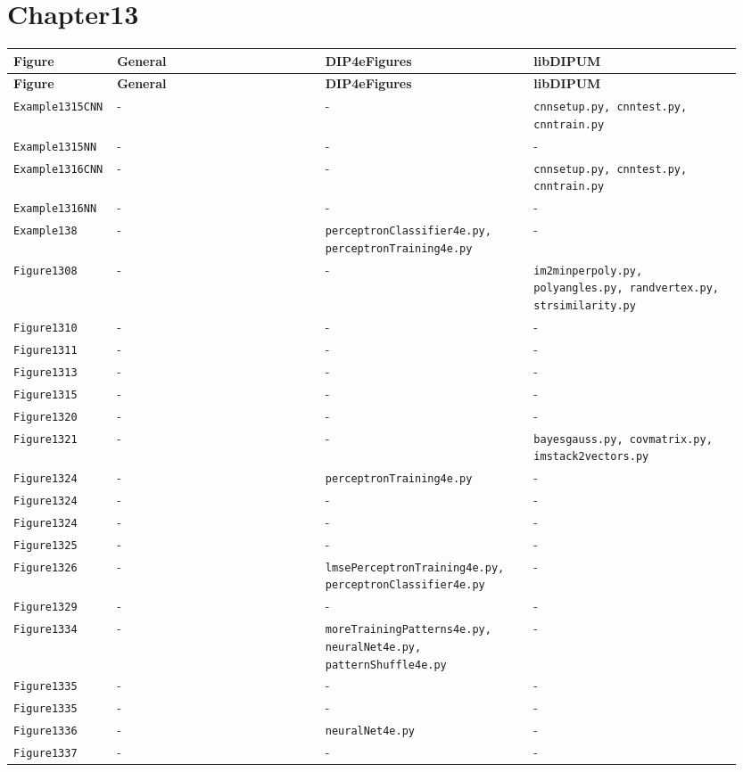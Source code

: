 \documentclass[10pt]{article}
\begin{document}
\section*{Chapter13}
\setlength{\tabcolsep}{4pt}
\begin{longtable}{p{0.11\linewidth} p{0.28\linewidth} p{0.28\linewidth} p{0.28\linewidth}}
\toprule
\textbf{Figure} & \textbf{General} & \textbf{DIP4eFigures} & \textbf{libDIPUM} \\
\midrule
\endfirsthead
\toprule
\textbf{Figure} & \textbf{General} & \textbf{DIP4eFigures} & \textbf{libDIPUM} \\
\midrule
\endhead
\bottomrule
\endfoot
\texttt{Example1315CNN} & - & - & \texttt{cnnsetup.py, cnntest.py, cnntrain.py} \\
\texttt{Example1315NN} & - & - & - \\
\texttt{Example1316CNN} & - & - & \texttt{cnnsetup.py, cnntest.py, cnntrain.py} \\
\texttt{Example1316NN} & - & - & - \\
\texttt{Example138} & - & \texttt{perceptronClassifier4e.py, perceptronTraining4e.py} & - \\
\texttt{Figure1308} & - & - & \texttt{im2minperpoly.py, polyangles.py, randvertex.py, strsimilarity.py} \\
\texttt{Figure1310} & - & - & - \\
\texttt{Figure1311} & - & - & - \\
\texttt{Figure1313} & - & - & - \\
\texttt{Figure1315} & - & - & - \\
\texttt{Figure1320} & - & - & - \\
\texttt{Figure1321} & - & - & \texttt{bayesgauss.py, covmatrix.py, imstack2vectors.py} \\
\texttt{Figure1324} & - & \texttt{perceptronTraining4e.py} & - \\
\texttt{Figure1324} & - & - & - \\
\texttt{Figure1324} & - & - & - \\
\texttt{Figure1325} & - & - & - \\
\texttt{Figure1326} & - & \texttt{lmsePerceptronTraining4e.py, perceptronClassifier4e.py} & - \\
\texttt{Figure1329} & - & - & - \\
\texttt{Figure1334} & - & \texttt{moreTrainingPatterns4e.py, neuralNet4e.py, patternShuffle4e.py} & - \\
\texttt{Figure1335} & - & - & - \\
\texttt{Figure1335} & - & - & - \\
\texttt{Figure1336} & - & \texttt{neuralNet4e.py} & - \\
\texttt{Figure1337} & - & - & - \\
\end{longtable}
\end{document}
